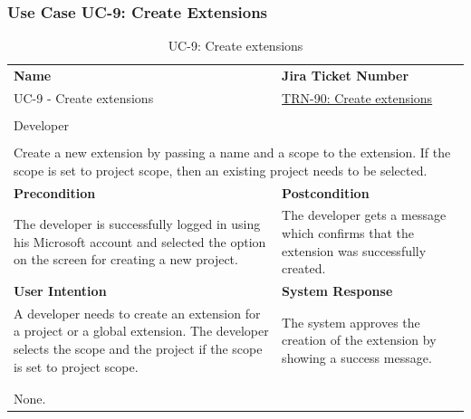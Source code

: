 \subsubsection{Use Case UC-9: Create Extensions}\label{subsubsec:use-case-uc-9:-create-extensions}

\begin{table}[H]
    \centering
    \begin{tabular}{|p{}|p{}|}

        \hline
        \rowcolor{gray!50}\textbf{Name} & \textbf{Jira Ticket Number} \\
        UC-9 - Create extensions &
        \href{https://fh-burgenland.atlassian.net/browse/TRN-90}{TRN-90: Create extensions} \\ \hline

        \rowcolor{gray!50}\multicolumn{2}{|l|}{\textbf{User Role}} \\
        \multicolumn{2}{|l|}{Developer} \\ \hline

        \rowcolor{gray!50}\multicolumn{2}{|l|}{\textbf{Purpose}} \\
        \multicolumn{2}{|p{1\textwidth}|}{Create a new extension by passing a name and a scope to the extension. If the scope is set to project scope, then an existing project needs to be selected.} \\ \hline

        \rowcolor{gray!50}\textbf{Precondition} & \textbf{Postcondition} \\
        The developer is successfully logged in using his Microsoft account and selected the option on the screen for creating a new project.
        &
        The developer gets a message which confirms that the extension was successfully created. \\ \hline

        \rowcolor{gray!50}\textbf{User Intention} & \textbf{System Response} \\
        A developer needs to create an extension for a project or a global extension.
        The developer selects the scope and the project if the scope is set to project scope.
        &
        The system approves the creation of the extension by showing a success message. \\ \hline

        \multicolumn{2}{|c|}{} \\ \hline

        \rowcolor{gray!50}\multicolumn{2}{|l|}{\textbf{Remarks}} \\
        \multicolumn{2}{|p{1\textwidth}|}{None.} \\ \hline
    \end{tabular}
    \caption{UC-9: Create extensions}
    \label{tab:uc-9_create_extensions}
\end{table}

